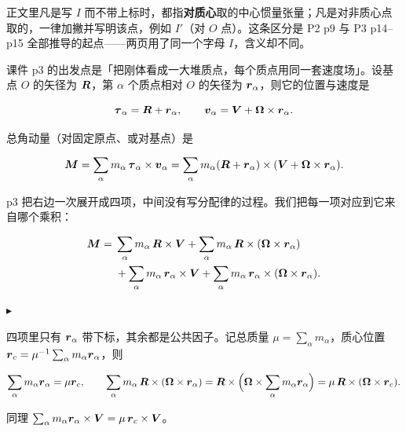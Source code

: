 \documentclass[11pt]{ctexart}
\newcommand{\step}[1]{\par\vspace{3pt}\noindent
  {\color{violet}\small$\blacktriangleright$}\hspace{3pt}{\bfseries\color{violetdeep}#1}\par\vspace{1pt}}
\begin{document}
正文里凡是写 $I$ 而不带上标时，都指\textbf{对质心}取的中心惯量张量；凡是对非质心点取的，一律加撇并写明该点，例如 $I'$（对 $O$ 点）。这条区分是 P2 p9 与 P3 p14--p15 全部推导的起点——两页用了同一个字母 $I$，含义却不同。



课件 p3 的出发点是「把刚体看成一大堆质点，每个质点用同一套速度场」。设基点 $O$ 的矢径为 $\boldsymbol{R}$，第 $\alpha$ 个质点相对 $O$ 的矢径为 $\boldsymbol{r}_\alpha$，则它的位置与速度是

\[
\boldsymbol{\tau}_\alpha=\boldsymbol{R}+\boldsymbol{r}_\alpha,\qquad
\boldsymbol{v}_\alpha=\boldsymbol{V}+\boldsymbol{\Omega}\times\boldsymbol{r}_\alpha .
\]


总角动量（对固定原点、或对基点）是

\[
\boldsymbol{M}=\sum_\alpha m_\alpha\,\boldsymbol{\tau}_\alpha\times\boldsymbol{v}_\alpha
=\sum_\alpha m_\alpha(\boldsymbol{R}+\boldsymbol{r}_\alpha)\times(\boldsymbol{V}+\boldsymbol{\Omega}\times\boldsymbol{r}_\alpha).
\]

p3 把右边一次展开成四项，中间没有写分配律的过程。我们把每一项对应到它来自哪个乘积：

\[
\begin{aligned}
\boldsymbol{M}={}&\sum_\alpha m_\alpha\,\boldsymbol{R}\times\boldsymbol{V}
+\sum_\alpha m_\alpha\,\boldsymbol{R}\times(\boldsymbol{\Omega}\times\boldsymbol{r}_\alpha)\\
&+\sum_\alpha m_\alpha\,\boldsymbol{r}_\alpha\times\boldsymbol{V}
+\sum_\alpha m_\alpha\,\boldsymbol{r}_\alpha\times(\boldsymbol{\Omega}\times\boldsymbol{r}_\alpha).
\end{aligned}
\]

\step{第一步：把「和」提出来}
四项里只有 $\boldsymbol{r}_\alpha$ 带下标，其余都是公共因子。记总质量 $\mu=\sum_\alpha m_\alpha$，质心位置 $\boldsymbol{r}_c=\mu^{-1}\sum_\alpha m_\alpha\boldsymbol{r}_\alpha$，则

\[
\sum_\alpha m_\alpha\boldsymbol{r}_\alpha=\mu\boldsymbol{r}_c,\qquad
\sum_\alpha m_\alpha\,\boldsymbol{R}\times(\boldsymbol{\Omega}\times\boldsymbol{r}_\alpha)
=\boldsymbol{R}\times\Bigl(\boldsymbol{\Omega}\times\sum_\alpha m_\alpha\boldsymbol{r}_\alpha\Bigr)
=\mu\,\boldsymbol{R}\times(\boldsymbol{\Omega}\times\boldsymbol{r}_c).
\]

同理 $\sum_\alpha m_\alpha\boldsymbol{r}_\alpha\times\boldsymbol{V}=\mu\,\boldsymbol{r}_c\times\boldsymbol{V}$。
\end{document}
